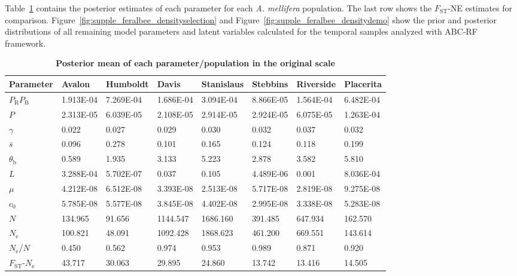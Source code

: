 \documentclass[a4paper, 12pt]{article}
\begin{document}
Table~\ref{tab:supple_bees_posteriors} contains the posterior estimates of each parameter for each \textit{A. mellifera} population. The last row shows the $F_{\mathrm{ST}}$-NE estimates for comparison. Figure~\ref{fig:supple_feralbee_densityselection} and Figure~\ref{fig:supple_feralbee_densitydemo} show the prior and posterior distributions of all remaining model parameters and latent variables calculated for the temporal samples analyzed with ABC-RF framework.\\

\begin{table}[!ht]
\caption{\textbf{Posterior mean of each parameter/population in the original scale}}
\centering
\begin{tabular}{llllllll}
\cmidrule(r){1-8}
Parameter               &Avalon	&Humboldt &Davis &Stanislaus	&Stebbins	&Riverside	&Placerita \\
\midrule
$P_\mathrm{R}P_\mathrm{B}$ 	            &1.913E-04 &7.269E-04  &1.686E-04 &3.094E-04 &8.866E-05 &1.564E-04 &6.482E-04 \\
$P$	                    &2.313E-05 &6.039E-05  &2.108E-05 &2.914E-05 &2.924E-05 &6.075E-05 &1.263E-04 \\
$\gamma$	            &0.022	   &0.027	   &0.029	  &0.030	 &0.032	    &0.037	   &0.032 \\
$\bar{s}$	            &0.096	   &0.278	   &0.101	  &0.165	 &0.124	    &0.118	   &0.199 \\
$\theta_{\mathrm{b}}$	&0.589	   &1.935	   &3.133	  &5.223     &2.878	    &3.582	   &5.810 \\
$L$	                    &3.288E-04 &5.702E-07  &0.037	  &0.105	 &4.489E-06	&0.001	   &8.036E-04\\
$\mu$ 	                &4.212E-08 &6.512E-08  &3.393E-08 &2.513E-08 &5.717E-08	&2.819E-08 &9.275E-08 \\
$c_{\mathrm{0}}$	    &5.785E-08 &5.577E-08  &3.845E-08 &4.402E-08 &2.995E-08	&3.338E-08 &5.283E-08 \\
$N$ 	                &134.965   &91.656	   &1144.547  &1686.160  &391.485	&647.934   &162.570 \\
$N_{\mathrm{e}}$	    &100.821   &48.091	   &1092.428  &1868.623  &461.200	&669.551   &143.614 \\
$N_{\mathrm{e}}/N$	    &0.450	   &0.562	   &0.974	  &0.953	 &0.989	    &0.871	   &0.920 \\
\midrule 							
$F_{\mathrm{ST}}$-$N_\mathrm{e}$	&43.717	   &30.063	   &29.895	  &24.860	&13.742	   &13.416	  &14.505 \\
\bottomrule
\end{tabular}
\label{tab:supple_bees_posteriors}
\end{table}
\end{document}
